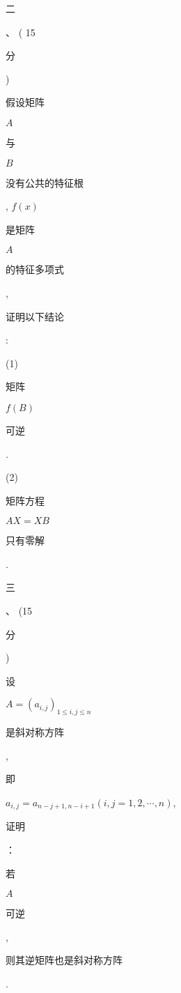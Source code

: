 \documentclass[10pt]{article}
\begin{document}
\begin{CJK}{UTF8}{mj}二\end{CJK}、 ( 15 \begin{CJK}{UTF8}{mj}分\end{CJK}) \begin{CJK}{UTF8}{mj}假设矩阵\end{CJK} $A$ \begin{CJK}{UTF8}{mj}与\end{CJK} $B$ \begin{CJK}{UTF8}{mj}没有公共的特征根\end{CJK}, $f(x)$ \begin{CJK}{UTF8}{mj}是矩阵\end{CJK} $A$ \begin{CJK}{UTF8}{mj}的特征多项式\end{CJK}, \begin{CJK}{UTF8}{mj}证明以下结论\end{CJK}:

(1) \begin{CJK}{UTF8}{mj}矩阵\end{CJK} $f(B)$ \begin{CJK}{UTF8}{mj}可逆\end{CJK}.

(2) \begin{CJK}{UTF8}{mj}矩阵方程\end{CJK} $A X=X B$ \begin{CJK}{UTF8}{mj}只有零解\end{CJK}.

\begin{CJK}{UTF8}{mj}三\end{CJK}、 (15 \begin{CJK}{UTF8}{mj}分\end{CJK}) \begin{CJK}{UTF8}{mj}设\end{CJK} $A=\left(a_{i, j}\right)_{1 \leq i, j \leq n}$ \begin{CJK}{UTF8}{mj}是斜对称方阵\end{CJK}, \begin{CJK}{UTF8}{mj}即\end{CJK} $a_{i, j}=a_{n-j+1, n-i+1}(i, j=1,2, \cdots, n)$, \begin{CJK}{UTF8}{mj}证明\end{CJK}：\begin{CJK}{UTF8}{mj}若\end{CJK} $A$ \begin{CJK}{UTF8}{mj}可逆\end{CJK}, \begin{CJK}{UTF8}{mj}则其逆矩阵也是斜对称方阵\end{CJK}.
\end{document}
